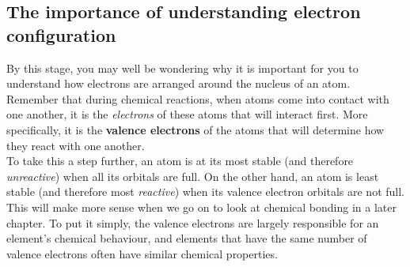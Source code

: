 

\subsection{The importance of understanding electron configuration}

By this stage, you may well be wondering why it is important for you to understand how electrons are arranged around the nucleus of an atom. Remember that during chemical reactions, when atoms come into contact with one another, it is the \textit{electrons} of these atoms that will interact first. More specifically, it is the \textbf{valence electrons} of the atoms that will determine how they react with one another.\\ 

To take this a step further, an atom is at its most stable (and therefore \textit{unreactive}) when all its orbitals are full. On the other hand, an atom is least stable (and therefore most \textit{reactive}) when its valence electron orbitals are not full. This will make more sense when we go on to look at chemical bonding in a later chapter. To put it simply, the valence electrons are largely responsible for an element's chemical behaviour, and elements that have the same number of valence electrons often have similar chemical properties. 

